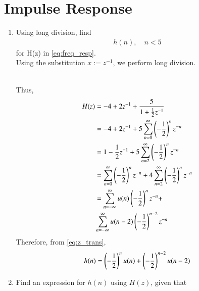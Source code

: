 \documentclass[journal,12pt,twocolumn]{IEEEtran}
\renewcommand\thesection{\arabic{section}}
\begin{document}
\section{Impulse Response}
\begin{enumerate}[label=\thesection.\arabic*]
	\item Using long division, 
find
		\begin{align}
			h(n), \quad n < 5
		\end{align}
		for H(z) in 
		\eqref{eq:freq_resp}.
\\
\solution Using the substitution $x := z^{-1}$, we perform long division.

\\
Thus,
\begin{align}
	H(z) &= -4 + 2z^{-1} + \frac{5}{1 + \frac{1}{2}z^{-1}} \\
			&= -4 + 2z^{-1} + 5\sum_{n = 0}^{\infty}\left(-\frac{1}{2}\right)^nz^{-n} \\
			&= 1 - \frac{1}{2}z^{-1} + 5\sum_{n = 2}^{\infty}\left(-\frac{1}{2}\right)^nz^{-n} \\
			&= \sum_{n = 0}^{\infty}\left(-\frac{1}{2}\right)^nz^{-n} + 4\sum_{n = 2}^{\infty}\left(-\frac{1}{2}\right)^nz^{-n} \\
			&= \sum_{n = -\infty}^{\infty}u(n)\left(-\frac{1}{2}\right)^nz^{-n} + \nonumber \\
			&\sum_{n = -\infty}^{\infty}u(n - 2)\left(-\frac{1}{2}\right)^{n - 2}z^{-n}
\end{align}
Therefore, from \eqref{eq:z_trans}, 
\begin{align}
	h(n) = \left(-\frac{1}{2}\right)^{n}u(n) + \left(-\frac{1}{2}\right)^{n-2}u(n-2)
\end{align}
\item\label{prob:impulse_resp}
Find an expression for $h(n)$ using $H(z)$, given that 


\end{enumerate}
\end{document}
